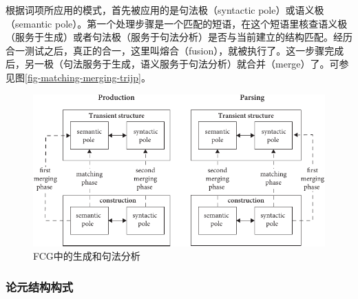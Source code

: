 \z
根据词项所应用的模式，首先被应用的是句法极（syntactic pole）或语义极（semantic pole）。第一个处理步骤是一个匹配的短语，在这个短语里核查语义极（服务于生成）或者句法极（服务于句法分析）是否与当前建立的结构匹配。经历合一测试之后，真正的合一，这里叫熔合（fusion），就被执行了。这一步骤完成后，另一极（句法服务于生成，语义服务于句法分析）就合并（merge）了。可参见图\vref{fig-matching-merging-trijp}。

\begin{figure}
\includegraphics[width=.98\textwidth]{Figures/production-parsing-fcg.pdf}
\caption{\label{fig-matching-merging-trijp}FCG中的生成和句法分析\citep[]{vanTrijp2013a}}
\end{figure}%

\subsubsection{论元结构构式}

